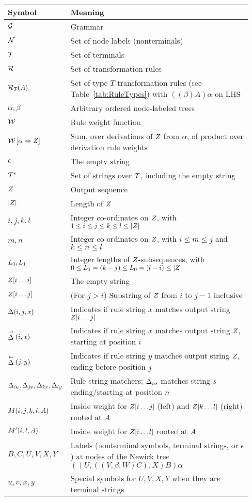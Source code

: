 \documentclass[10pt]{article}
\newcommand{\tabnum}[1]{\ref{tab:#1}}
\newcommand{\tabref}[1]{Table~\tabnum{#1}}
\begin{document}
\noindent
\begin{tabular}{ll}
Symbol & Meaning \\
\hline
${\cal G}$ & Grammar \\
${\cal N}$ & Set of node labels (nonterminals) \\
${\cal T}$ & Set of terminals \\
${\cal R}$ & Set of transformation rules \\
${\cal R}_{T}(A)$ & Set of type-$T$ transformation rules (see \tabref{RuleTypes}) with $((\beta)A)\alpha$ on LHS \\
$\alpha,\beta$ & Arbitrary ordered node-labeled trees \\
${\cal W}$ & Rule weight function \\
${\cal W} \left[ {\alpha} \Rightarrow {Z} \right]$ & Sum, over derivations of $Z$ from $\alpha$, of product over derivation rule weights \\
$\epsilon$ & The empty string \\
${\cal T}^\ast$ & Set of strings over ${\cal T}$, including the empty string \\
$Z$ & Output sequence \\
$|Z|$ & Length of $Z$ \\
$i,j,k,l$ & Integer co-ordinates on $Z$, with $1 \leq i \leq j \leq k \leq l \leq |Z|$ \\
$m,n$ & Integer co-ordinates on $Z$, with $i \leq m \leq j$ and $k \leq n \leq l$ \\
$L_0, L_1$ & Integer lengths of $Z$-subsequences, with $0 \leq L_1 = (k-j) \leq L_0 = (l-i) \leq |Z|$ \\
$Z[i \ldots i]$ & The empty string \\
$Z[i \ldots j]$ & (For $j > i$) Substring of $Z$ from $i$ to $j-1$ inclusive \\
$\Delta(i,j,x)$ & Indicates if rule string $x$ matches output string $Z[i \ldots j]$ \\
$\stackrel{\rightarrow}{\Delta}(i,x)$ & Indicates if rule string $x$ matches output string $Z$, starting at position $i$ \\
$\stackrel{\leftarrow}{\Delta}(j,y)$ & Indicates if rule string $y$ matches output string $Z$, ending before position $j$ \\
$\Delta_{iu},\Delta_{jv},\Delta_{kx},\Delta_{ly}$ & Rule string matchers; $\Delta_{ns}$ matches string $s$ ending/starting at position $n$ \\
$M(i,j,k,l,A)$ & Inside weight for $Z[i \ldots j]$ (left) and $Z[k \ldots l]$ (right) rooted at $A$ \\
$M'(i,l,A)$ & Inside weight for $Z[i \ldots l]$ rooted at $A$ \\
$B,C,U,V,X,Y$ & Labels (nonterminal symbols, terminal strings, or $\epsilon$) at nodes of the Newick tree $((U,((V,\beta,W)C),X)B)\alpha$ \\
$u,v,x,y$ & Special symbols for $U,V,X,Y$ when they are terminal strings \\
\end{tabular}
\end{document}
